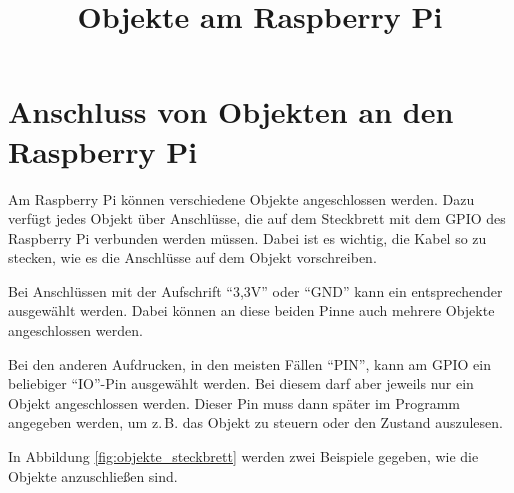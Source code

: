 \documentclass[11pt, a4paper]{scrartcl}
\title{Objekte am Raspberry Pi}
\begin{document}

\section*{Anschluss von Objekten an den Raspberry Pi}

Am Raspberry Pi können verschiedene Objekte angeschlossen werden. Dazu verfügt jedes Objekt über Anschlüsse, die auf dem Steckbrett mit dem GPIO des Raspberry Pi verbunden werden müssen. Dabei ist es wichtig, die Kabel so zu stecken, wie es die Anschlüsse auf dem Objekt vorschreiben.

Bei Anschlüssen mit der Aufschrift \enquote{3,3V} oder \enquote{GND} kann ein entsprechender ausgewählt werden. Dabei können an diese beiden Pinne auch mehrere Objekte angeschlossen werden.

Bei den anderen Aufdrucken, in den meisten Fällen \enquote{PIN}, kann am GPIO ein beliebiger \enquote{IO}-Pin ausgewählt werden. Bei diesem darf aber jeweils nur ein Objekt angeschlossen werden. Dieser Pin muss dann später im Programm angegeben werden, um z.\,B. das Objekt zu steuern oder den Zustand auszulesen.

In Abbildung \ref{fig:objekte_steckbrett} werden zwei Beispiele gegeben, wie die Objekte anzuschließen sind.
\end{document}
